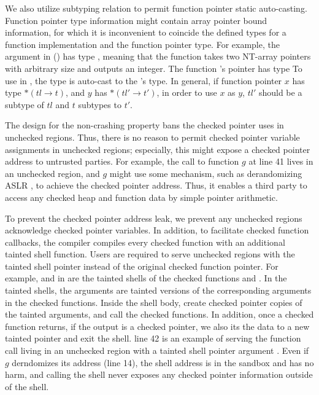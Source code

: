 We also utilize \systemname subtyping relation to permit function pointer static auto-casting.
Function pointer type information might contain array pointer bound information,
for which it is inconvenient to coincide the defined types for a function implementation and the function pointer type. 
For example, the  argument in  ()
has type ,
meaning that the function takes two NT-array pointers with arbitrary size and outputs an integer.
The function 's pointer has type 
To use  in , the type is auto-cast to the 's type.
In general, if function pointer $x$ has type $* (tl \to t)$, and  $y$ has $* (tl' \to t')$,
in order to use $x$ as $y$, $tl'$ should be a subtype of $tl$ and $t$ subtypes to $t'$.

The design for the non-crashing property bans the checked pointer uses in unchecked regions.
Thus, there is no reason to permit checked pointer variable assignments in unchecked regions;
especially, this might expose a checked pointer address to untrusted parties.
For example, the call to function $g$ at  line 41 lives in an unchecked region,
and $g$ might use some mechanism, such as derandomizing ASLR \cite{shacham-aslr},
to achieve the checked pointer address.
Thus, it enables a third party to access any checked heap and function data by simple pointer arithmetic.

To prevent the checked pointer address leak,
we prevent any unchecked regions acknowledge checked pointer variables.
In addition, to facilitate checked function callbacks, 
the \systemname compiler compiles every checked function
with an additional tainted shell function.
Users are required to serve unchecked regions with the tainted shell pointer instead of the original checked function pointer.
For example,  and  in  
are the tainted shells of the checked functions  and .
In the tainted shells, the arguments are tainted versions of the corresponding arguments in the checked functions.
Inside the shell body, create checked pointer copies of the tainted arguments, and call the checked functions.
In addition, once a checked function returns,
if the output is a checked pointer, we also its the data to a new tainted pointer and exit the shell.
 line 42 is an example of serving the function call living in an unchecked region
with a tainted shell pointer argument .
Even if $g$ derndomizes its address (line 14), the shell address is in the sandbox and has no harm,
and calling the shell never exposes any checked pointer information outside of the shell.

